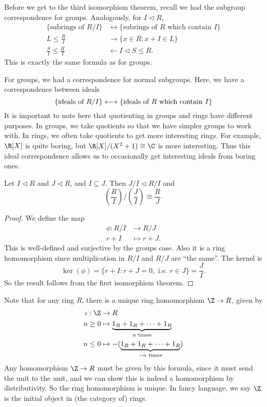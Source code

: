 \documentclass[a4paper]{article}
\begin{document}
Before we get to the third isomorphism theorem, recall we had the subgroup correspondence for groups. Analogously, for $I \lhd R$,
\begin{align*}
  \{\text{subrings of }R/I\} &\longleftrightarrow\{\text{subrings of }R\text{ which contain }I\}\\
  L \leq \frac{R}{I} &\longrightarrow \{x \in R: x + I \in L\}\\
  \frac{S}{I} \leq \frac{R}{I} &\longleftarrow I \lhd S \leq R.
\end{align*}
This is exactly the same formula as for groups.

For groups, we had a correspondence for normal subgroups. Here, we have a correspondence between ideals
\[
  \{\text{ideals of }R/I\} \longleftrightarrow\{\text{ideals of }R\text{ which contain }I\}\\
\]
It is important to note here that quotienting in groups and rings have different purposes. In groups, we take quotients so that we have simpler groups to work with. In rings, we often take quotients to get more interesting rings. For example, $\R[X]$ is quite boring, but $\R[X]/(X^2 + 1) \cong \C$ is more interesting. Thus this ideal correspondence allows us to occasionally get interesting ideals from boring ones.

\begin{thm}
  Let $I \lhd R$ and $J \lhd R$, and $I \subseteq J$. Then $J / I \lhd R/I$ and
  \[
    \left(\frac{R}{I}\right) \big/ \left(\frac{J}{I}\right) \cong \frac{R}{J}.
  \]
\end{thm}

\begin{proof}
  We define the map
  \begin{align*}
    \phi: R/I &\to R/J\\
    r + I &\mapsto r + J.
  \end{align*}
  This is well-defined and surjective by the groups case. Also it is a ring homomorphism since multiplication in $R/I$ and $R/J$ are ``the same''. The kernel is
  \[
    \ker(\phi) = \{r + I: r + J = 0,\text{ i.e.\ } r \in J\} = \frac{J}{I}.
  \]
  So the result follows from the first isomorphism theorem.
\end{proof}

Note that for any ring $R$, there is a unique ring homomorphism $\Z \to R$, given by
\begin{align*}
  \iota: \Z &\to R\\
  n \geq 0 &\mapsto \underbrace{1_R + 1_R + \cdots + 1_R}_{n\text{ times}}\\
  n \leq 0 &\mapsto -(\underbrace{1_R + 1_R + \cdots + 1_R}_{-n\text{ times}})
\end{align*}
Any homomorphism $\Z \to R$ must be given by this formula, since it must send the unit to the unit, and we can show this is indeed a homomorphism by distributivity. So the ring homomorphism is unique. In fancy language, we say $\Z$ is the initial object in (the category of) rings.
\end{document}
